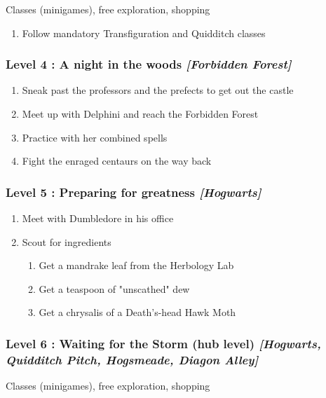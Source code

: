 Classes (minigames), free exploration, shopping
\begin{enumerate}[1)]
	\item Follow mandatory Transfiguration and Quidditch classes
\end{enumerate}

\subsubsection{Level 4 : A night in the woods \textit{[Forbidden Forest]}}
\begin{enumerate}[1)]
	\item Sneak past the professors and the prefects to get out the castle
	\item Meet up with Delphini and reach the Forbidden Forest
	\item Practice with her combined spells
	\item Fight the enraged centaurs on the way back
\end{enumerate}

\subsubsection{Level 5 : Preparing for greatness \textit{[Hogwarts]}}
\begin{enumerate}[1)]
	\item Meet with Dumbledore in his office
	\item Scout for ingredients
	\begin{enumerate}[1.]
		\item Get a mandrake leaf from the Herbology Lab
		\item Get a teaspoon of "unscathed" dew
		\item Get a chrysalis of a Death's-head Hawk Moth
	\end{enumerate}
\end{enumerate}

\subsubsection{Level 6 : Waiting for the Storm (hub level) \textit{[Hogwarts, Quidditch Pitch, Hogsmeade, Diagon Alley]}}

Classes (minigames), free exploration, shopping

